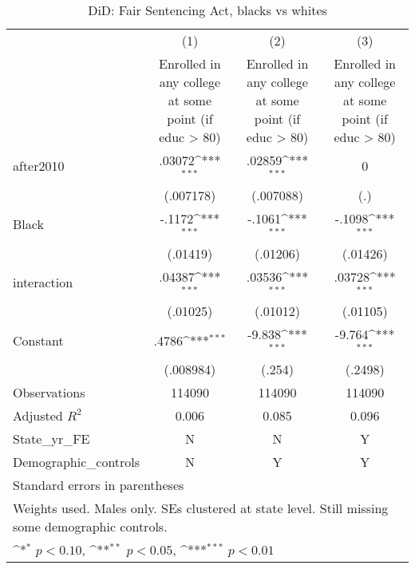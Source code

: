 \begin{table}[htbp]\centering
\def\sym#1{\ifmmode^{#1}\else\(^{#1}\)\fi}
\caption{DiD: Fair Sentencing Act, blacks vs whites}
\begin{tabular}{l*{3}{c}}
\hline\hline
                    &\multicolumn{1}{c}{(1)}&\multicolumn{1}{c}{(2)}&\multicolumn{1}{c}{(3)}\\
                    &\multicolumn{1}{c}{Enrolled in any college at some point (if educ > 80)}&\multicolumn{1}{c}{Enrolled in any college at some point (if educ > 80)}&\multicolumn{1}{c}{Enrolled in any college at some point (if educ > 80)}\\
\hline
after2010           &      .03072\sym{***}&      .02859\sym{***}&           0         \\
                    &   (.007178)         &   (.007088)         &         (.)         \\
[1em]
Black               &      -.1172\sym{***}&      -.1061\sym{***}&      -.1098\sym{***}\\
                    &    (.01419)         &    (.01206)         &    (.01426)         \\
[1em]
interaction         &      .04387\sym{***}&      .03536\sym{***}&      .03728\sym{***}\\
                    &    (.01025)         &    (.01012)         &    (.01105)         \\
[1em]
Constant            &       .4786\sym{***}&      -9.838\sym{***}&      -9.764\sym{***}\\
                    &   (.008984)         &      (.254)         &     (.2498)         \\
\hline
Observations        &      114090         &      114090         &      114090         \\
Adjusted \(R^{2}\)  &       0.006         &       0.085         &       0.096         \\
State\_yr\_FE         &           N         &           N         &           Y         \\
Demographic\_controls&           N         &           Y         &           Y         \\
\hline\hline
\multicolumn{4}{l}{\footnotesize Standard errors in parentheses}\\
\multicolumn{4}{l}{\footnotesize Weights used. Males only. SEs clustered at state level. Still missing some demographic controls.}\\
\multicolumn{4}{l}{\footnotesize \sym{*} \(p<0.10\), \sym{**} \(p<0.05\), \sym{***} \(p<0.01\)}\\
\end{tabular}
\end{table}
